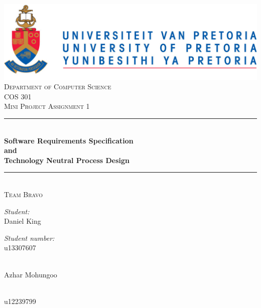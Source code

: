 \begin{titlepage}
	
	\begin{center}
		\includegraphics[width=1\textwidth]{../Images/University_of_Pretoria_Logo.PNG}\\[0.5cm]    
		\textsc{\LARGE Department of Computer Science}\\[0.5cm]
		\textsc{\Large COS 301}\\[0.5cm]
		\textsc{\Large Mini Project Assignment 1} \nocite{ref}\\[0.75cm]
		\rule{\linewidth}{0.5mm} \\[0.4cm]
		{ \huge \bfseries Software Requirements Specification \\ [0.1cm] 
			and \\ [0.5cm] Technology Neutral Process Design}\\[0.5cm]
		\rule{\linewidth}{0.5mm} \\[1cm]
		
		\textsc{\Large Team Bravo}\\[1cm]
		
		
		\begin{minipage}{0.4\textwidth}
			\begin{flushleft} \large
				\emph{Student:}\\[0.75cm]
				Daniel {King}
			\end{flushleft}
		\end{minipage}
		\begin{minipage}{0.4\textwidth}
			\begin{flushright} \large
				\emph{Student number:} \\[0.75cm]
				u13307607
			\end{flushright}
		\end{minipage}
		
		
		\begin{minipage}{0.4\textwidth}
			\begin{flushleft} \large
				\emph{} \\
				Azhar {Mohungoo }
			\end{flushleft}
		\end{minipage}
		\begin{minipage}{0.4\textwidth}
			\begin{flushright} \large
				\emph{} \\
				u12239799
			\end{flushright}
		\end{minipage}
		

\end{center}
\end{titlepage}
